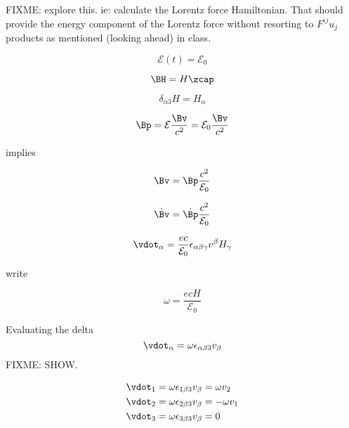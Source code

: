 FIXME: explore this.  ie: calculate the Lorentz force Hamiltonian.  That should provide the energy component of the Lorentz force without resorting to $F^{ij} u_j$ products as mentioned (looking ahead) in class.

\begin{equation}\label{eqn:relativisticElectrodynamicsT3:540}
\mathcal{E}(t) = \mathcal{E}_0
\end{equation}

\begin{equation}\label{eqn:relativisticElectrodynamicsT3:560}
\BH = H \zcap
\end{equation}

\begin{equation}\label{eqn:relativisticElectrodynamicsT3:580}
\delta_{\alpha 3} H = H_\alpha
\end{equation}

\begin{equation}\label{eqn:relativisticElectrodynamicsT3:600}
\Bp = \mathcal{E} \frac{\Bv}{c^2} = \mathcal{E}_0 \frac{\Bv}{c^2}
\end{equation}

implies

\begin{equation}\label{eqn:relativisticElectrodynamicsT3:620}
\Bv = \Bp \frac{c^2}{\mathcal{E}_0}
\end{equation}

\begin{equation}\label{eqn:relativisticElectrodynamicsT3:640}
\dot{\Bv} = \dot{\Bp} \frac{c^2}{\mathcal{E}_0}
\end{equation}

\begin{equation}\label{eqn:relativisticElectrodynamicsT3:660}
\vdot_\alpha = \frac{e c}{\mathcal{E}_0} \epsilon_{\alpha \beta \gamma} v^\beta H_\gamma
\end{equation}

write

\begin{equation}\label{eqn:relativisticElectrodynamicsT3:680}
\omega = \frac{e c H}{\mathcal{E}_0}
\end{equation}

Evaluating the delta 
\begin{equation}\label{eqn:relativisticElectrodynamicsT3:700}
\vdot_\alpha = \omega \epsilon_{\alpha \beta 3} v_\beta 
\end{equation}
FIXME: SHOW.

\begin{align}\label{eqn:relativisticElectrodynamicsT3:720}
\vdot_1 &= \omega \epsilon_{1 \beta 3} v_\beta = \omega v_2 \\
\vdot_2 &= \omega \epsilon_{2 \beta 3} v_\beta = - \omega v_1 \\
\vdot_3 &= \omega \epsilon_{3 \beta 3} v_\beta = 0
\end{align}

